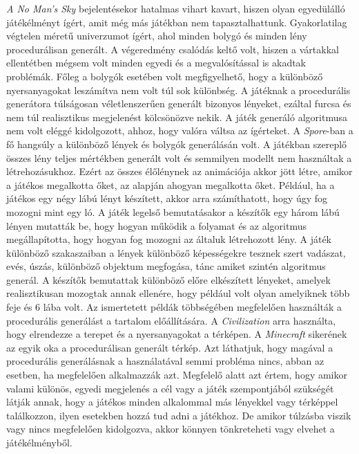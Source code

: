 \newline
\newline \textit{A No Man’s Sky} bejelentésekor hatalmas vihart kavart, hiszen olyan egyedülálló játékélményt ígért, amit még más játékban nem tapasztalhattunk. Gyakorlatilag végtelen méretű univerzumot ígért, ahol minden bolygó és minden lény procedurálisan generált. A végeredmény csalódás keltő volt, hiszen a vártakkal ellentétben mégsem volt minden egyedi és a megvalósítással is akadtak problémák. Főleg a bolygók esetében volt megfigyelhető, hogy a különböző nyersanyagokat leszámítva nem volt túl sok különbség. A játéknak a procedurális generátora túlságosan véletlenszerűen generált bizonyos lényeket, ezáltal furcsa és nem túl realisztikus megjelenést kölcsönözve nekik. A játék generáló algoritmusa nem volt eléggé kidolgozott, ahhoz, hogy valóra váltsa az ígérteket.
\newline
\newline A \textit{Spore}-ban a fő hangsúly a különböző lények és bolygók generálásán volt. A játékban szereplő összes lény teljes mértékben generált volt és semmilyen modellt nem használtak a létrehozásukhoz. Ezért az összes élőlénynek az animációja akkor jött létre, amikor a játékos megalkotta őket, az alapján ahogyan megalkotta őket. Például, ha a játékos egy négy lábú lényt készített, akkor arra számíthatott, hogy úgy fog mozogni mint egy ló. A játék legelső bemutatásakor a készítők egy három lábú lényen mutatták be, hogy hogyan működik a folyamat és az algoritmus megállapította, hogy hogyan fog mozogni az általuk létrehozott lény. A játék különböző szakaszaiban a lények különböző képességekre tesznek szert vadászat, evés, úszás, különböző objektum megfogása, tánc amiket szintén algoritmus generál. A készítők bemutattak különböző előre elkészített lényeket, amelyek realisztikusan mozogtak annak ellenére, hogy például volt olyan amelyiknek több feje és 6 lába volt.
\newline
\newline Az ismertetett példák többségében megfelelően használták a procedurális generálást a tartalom előállítására. A \textit{Civilization} arra használta, hogy elrendezze a terepet és a nyersanyagokat a térképen. A \textit{Minecraft} sikerének az egyik oka a procedurálisan generált térkép. Azt láthatjuk, hogy magával a procedurális generálásnak a használatával semmi probléma nincs, abban az esetben, ha megfelelően alkalmazzák azt. Megfelelő alatt azt értem, hogy amikor valami különös, egyedi megjelenés a cél vagy a játék szempontjából szükségét látják annak, hogy a játékos minden alkalommal más lényekkel vagy térképpel találkozzon, ilyen esetekben hozzá tud adni a játékhoz. De amikor túlzásba viszik vagy nincs megfelelően kidolgozva, akkor könnyen tönkreteheti vagy elvehet a játékélményből. 
